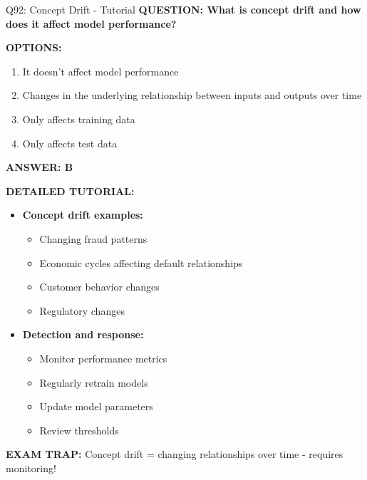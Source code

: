 \documentclass[8pt]{beamer}
\begin{document}
\begin{frame}{Q92: Concept Drift - Tutorial}
	\fontsize{6.5}{7.5}\selectfont
	\textbf{QUESTION: What is concept drift and how does it affect model performance?}
	
	\vspace{0.1cm}
	\textbf{OPTIONS:}
	\begin{enumerate}
		\item It doesn't affect model performance
		\item Changes in the underlying relationship between inputs and outputs over time
		\item Only affects training data
		\item Only affects test data
	\end{enumerate}
	
	\vspace{0.1cm}
	\textcolor{myblue}{\textbf{ANSWER: B}}
	
	\vspace{0.1cm}
	\textbf{DETAILED TUTORIAL:}
	\begin{itemize}
		\item \textbf{Concept drift examples:}
		\begin{itemize}
			\item Changing fraud patterns
			\item Economic cycles affecting default relationships
			\item Customer behavior changes
			\item Regulatory changes
		\end{itemize}
		\item \textbf{Detection and response:}
		\begin{itemize}
			\item Monitor performance metrics
			\item Regularly retrain models
			\item Update model parameters
			\item Review thresholds
		\end{itemize}
	\end{itemize}
	
	\textcolor{myred}{\textbf{EXAM TRAP:}} Concept drift = \textcolor{myblue}{changing relationships} over time - requires monitoring!
\end{frame}
\end{document}
